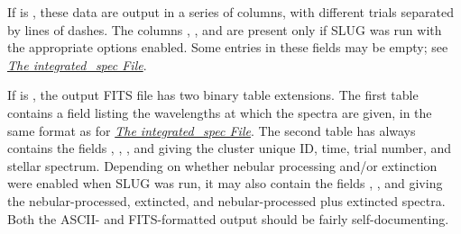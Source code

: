 \documentclass[letterpaper,10pt,english]{sphinxmanual}
\begin{document}
If  is , these data are output in a series of columns, with different trials separated by lines of dashes. The columns , , and  are present only if SLUG was run with the appropriate options enabled. Some entries in these fields may be empty; see {\hyperref[output:ssec-int-spec-file]{\emph{The integrated\_spec File}}}.

If  is , the output FITS file has two binary table extensions. The first table contains a field listing the wavelengths at which the spectra are given, in the same format as for {\hyperref[output:ssec-int-spec-file]{\emph{The integrated\_spec File}}}. The second table has always contains the fields , , , and  giving the cluster unique ID, time, trial number, and stellar spectrum. Depending on whether nebular processing and/or extinction were enabled when SLUG was run, it may also contain the fields , , and  giving the nebular-processed, extincted, and nebular-processed plus extincted spectra. Both the ASCII- and FITS-formatted output should be fairly self-documenting.
\end{document}

